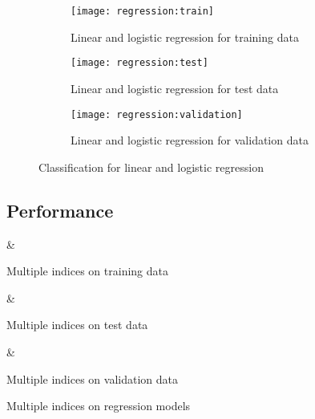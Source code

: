 \documentclass[journal]{IEEEtran}
\begin{document}
\begin{figure}[ht]
    \begin{subfigure}[b]{\linewidth}
        \texttt{[image: regression:train]}
        \caption{Linear and logistic regression for training data
        \label{fig:regression:train}}
    \end{subfigure}
    \begin{subfigure}[b]{\linewidth}
        \texttt{[image: regression:test]}
        \caption{Linear and logistic regression for test data
        \label{fig:regression:test}}
    \end{subfigure}
    \begin{subfigure}[b]{\linewidth}
        \texttt{[image: regression:validation]}
        \caption{Linear and logistic regression for validation data
        \label{fig:regression:validation}}
    \end{subfigure}
    \caption{Classification for linear and logistic regression
        \label{fig:regression}}
\end{figure}

\subsection{Performance}

\begin{table}
    \hfill
    \begin{subtable}{0.45\linewidth}
        {\csvcoli & \csvcolii}%
        \caption{Multiple indices on training data\label{tab:regression:index:train}}
    \end{subtable}
    \hfill%
    \begin{subtable}{0.45\linewidth}
        {\csvcoli & \csvcolii}%
        \caption{Multiple indices on test data\label{tab:regression:index:test}}
    \end{subtable}
    \hfill

    \begin{subtable}{\linewidth}
        {\csvcoli & \csvcolii}%
        \caption{Multiple indices on validation data\label{tab:regression:index:validation}}
    \end{subtable}
    \caption{Multiple indices on regression models\label{tab:regression:index}}
\end{table}
\end{document}
